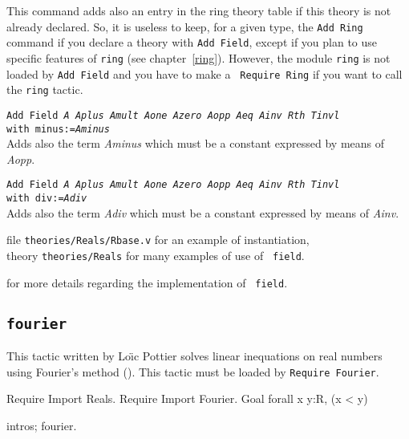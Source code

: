 This command adds also an entry in the ring theory table if this theory is not
already declared. So, it is useless to keep, for a given type, the {\tt Add
Ring} command if you declare a theory with {\tt Add Field}, except if you plan
to use specific features of {\tt ring} (see chapter~\ref{ring}). However, the
module {\tt ring} is not loaded by {\tt Add Field} and you have to make a {\tt
Require Ring} if you want to call the {\tt ring} tactic.

\begin{Variants}
\item {\tt Add Field {\it A} {\it Aplus} {\it Amult} {\it Aone} {\it Azero}
{\it Aopp} {\it Aeq} {\it Ainv} {\it Rth} {\it Tinvl}}\\
{\tt \phantom{Add Field }with minus:={\it Aminus}}\\
Adds also the term {\it Aminus} which must be a constant expressed by means of
{\it Aopp}.

\item {\tt Add Field {\it A} {\it Aplus} {\it Amult} {\it Aone} {\it Azero}
{\it Aopp} {\it Aeq} {\it Ainv} {\it Rth} {\it Tinvl}}\\
{\tt \phantom{Add Field }with div:={\it Adiv}}\\
Adds also the term {\it Adiv} which must be a constant expressed by means of
{\it Ainv}.
\end{Variants}

\SeeAlso file {\tt theories/Reals/Rbase.v} for an example of instantiation,\\
\phantom{\SeeAlso}theory {\tt theories/Reals} for many examples of use of {\tt
field}.

\SeeAlso \cite{DelMay01} for more details regarding the implementation of {\tt
field}.

\subsection{\tt fourier}

This tactic written by Lo{\"\i}c Pottier solves linear inequations on real numbers 
using Fourier's method (\cite{Fourier}). This tactic must be loaded by 
{\tt Require Fourier}.

\Example
\begin{coq_example*}
Require Import Reals.
Require Import Fourier.
Goal forall x y:R, (x < y)%
\end{coq_example*}

\begin{coq_example}
intros; fourier.
\end{coq_example}

